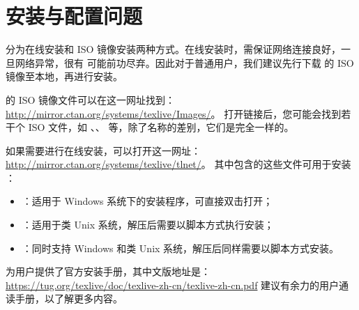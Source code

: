%
%
%
%


\section{安装与配置问题}
\label{sec:install}


\TeXLive{} 分为在线安装和 ISO 镜像安装两种方式。在线安装时，需保证网络连接良好，一旦网络异常，很有
可能前功尽弃。因此对于普通用户，我们建议先行下载 \TeXLive{} 的 ISO 镜像至本地，再进行安装。

\TeXLive{} 的 ISO 镜像文件可以在这一网址找到：\url{http://mirror.ctan.org/systems/texlive/Images/}。
打开链接后，您可能会找到若干个 ISO 文件，如 、、
 等，除了名称的差别，它们是完全一样的。

如果需要进行在线安装，可以打开这一网址：\url{http://mirror.ctan.org/systems/texlive/tlnet/}。
其中包含的这些文件可用于安装 \TeXLive{}：

\begin{itemize}
  \item {}：适用于 Windows 系统下的安装程序，可直接双击打开；
  \item {}：适用于类 Unix 系统，解压后需要以脚本方式执行安装；
  \item {}：同时支持 Windows 和类 Unix 系统，解压后同样需要以脚本方式安装。
\end{itemize}



\TeXLive{} 为用户提供了官方安装手册，其中文版地址是：
\url{https://tug.org/texlive/doc/texlive-zh-cn/texlive-zh-cn.pdf}
建议有余力的用户通读手册，以了解更多内容。

